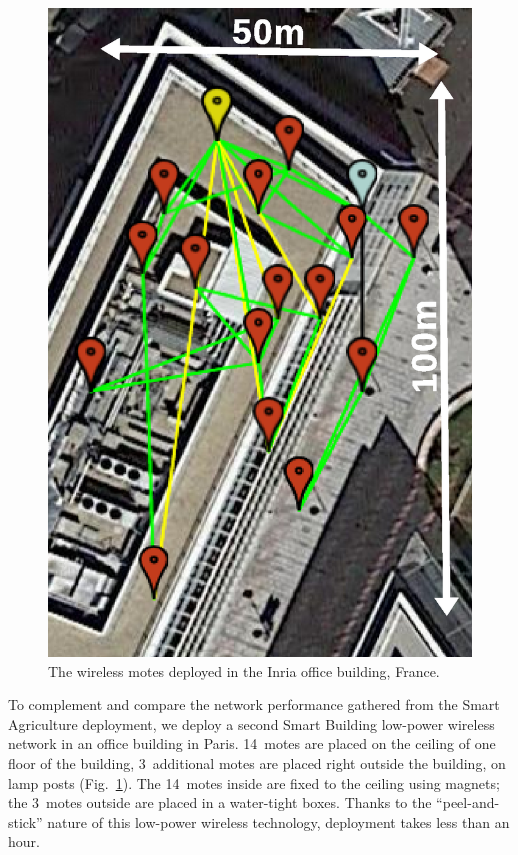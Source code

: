 \documentclass{elsarticle}
\newcommand{\building}            {Smart Building\xspace}
\newcommand{\agri}                {Smart Agriculture\xspace}
\begin{document}
\begin{figure}
\begin{minipage}[b]{0.3\textwidth}
        \includegraphics[width=\textwidth]{evalab_map_annotated.eps}
        \caption{The wireless motes deployed in the Inria office building, France.}
        \label{fig:evalab_map}
    \end{minipage}
\end{figure}


To complement and compare the network performance gathered from the \agri deployment, we deploy a second \building low-power wireless network in an office building in Paris.
14~motes are placed on the ceiling of one floor of the building, 3~additional motes are placed right outside the building, on lamp posts (Fig.~\ref{fig:evalab_map}).
The 14~motes inside are fixed to the ceiling using magnets; the 3~motes outside are placed in a water-tight boxes.
Thanks to the ``peel-and-stick'' nature of this low-power wireless technology, deployment takes less than an hour.
\end{document}
